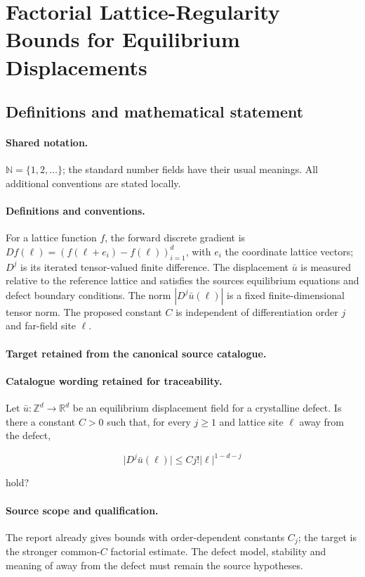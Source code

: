 \documentclass[11pt]{article}
\begin{document}
\section{Factorial Lattice-Regularity Bounds for Equilibrium Displacements}\label{statement}

\subsection{Definitions and mathematical statement}

\paragraph{Shared notation.}$\mathbb N=\{1,2,\ldots\}$; the standard number fields have their usual meanings. All additional conventions are stated locally.


\paragraph{Definitions and conventions.}
For a lattice function $f$, the forward discrete gradient is $Df(\ell)=(f(\ell+e_i)-f(\ell))_{i=1}^d$, with $e_i$ the coordinate lattice vectors; $D^j$ is its iterated tensor-valued finite difference. The displacement $\bar u$ is measured relative to the reference lattice and satisfies the source\textquotesingle s equilibrium equations and defect boundary conditions. The norm $|D^j\bar u(\ell)|$ is a fixed finite-dimensional tensor norm. The proposed constant $C$ is independent of differentiation order $j$ and far-field site $\ell$.

\paragraph{Target retained from the canonical source catalogue.}
\paragraph{Catalogue wording retained for traceability.}
Let $\bar u:\mathbb Z^d\to\mathbb R^d$ be an equilibrium displacement field for a crystalline defect. Is there a constant $C>0$ such that, for every $j\geq1$ and lattice site $\ell$ away from the defect,

$$\lvert D^j\bar u(\ell)\rvert\leq Cj!\lvert\ell\rvert^{1-d-j}$$

hold?

\paragraph{Source scope and qualification.}
The report already gives bounds with order-dependent constants $C_j$; the target is the stronger common-$C$ factorial estimate. The defect model, stability and meaning of away from the defect must remain the source hypotheses.
\end{document}
